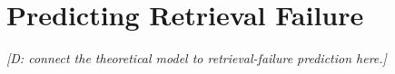 \section{Predicting Retrieval Failure}
\label{sec:prediction}
\textit{[D: connect the theoretical model to retrieval-failure prediction here.]}
